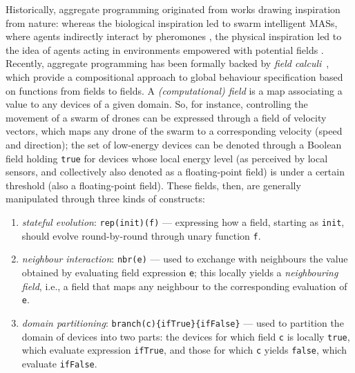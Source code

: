 \documentclass[11pt]{article}
\begin{document}
Historically, aggregate programming originated from works drawing inspiration from nature: whereas the biological inspiration led to swarm intelligent MASs, where agents indirectly interact by pheromones \cite{DBLP:conf/atal/ParunakBS02}, the physical inspiration led to the idea of agents acting in environments empowered with potential fields \cite{DBLP:journals/trob/HwangA92}.
%
Recently, aggregate programming has been formally backed by \emph{field calculi}~\cite{viroli2019jlamp-si-coord}, which provide a compositional approach
 to global behaviour specification
 based on functions from fields to fields.
%
A \emph{(computational) field} is a map associating a value to any devices of a given domain.
%
So, for instance, controlling the movement of a swarm of drones can be expressed through a field of velocity vectors, which maps any drone of the swarm to a corresponding velocity (speed and direction); the set of low-energy devices can be denoted through a Boolean field holding \texttt{true} for devices whose local energy level (as perceived by local sensors, and collectively also denoted as a floating-point field) is under a certain threshold (also a floating-point field).
%
These fields, then, are generally manipulated through three kinds of constructs:
\begin{enumerate}
\item \emph{stateful evolution}: \lstinline|rep(init)(f)| --- expressing how a field, starting as \lstinline|init|, should evolve round-by-round through unary function \lstinline|f|.
\item \emph{neighbour interaction}: \lstinline|nbr(e)| --- used to exchange with neighbours the value obtained by evaluating field expression \lstinline|e|; this locally yields a \emph{neighbouring field}, i.e., a field that maps any neighbour to the corresponding evaluation of \lstinline|e|.
\item \emph{domain partitioning}: \lstinline|branch(c){ifTrue}{ifFalse}| --- used to partition the domain of devices into two parts: the devices for which field \lstinline|c| is locally \lstinline|true|, which evaluate expression \lstinline|ifTrue|, and those for which \lstinline|c| yields \lstinline|false|, which evaluate \lstinline|ifFalse|. 
\end{enumerate}
\end{document}
